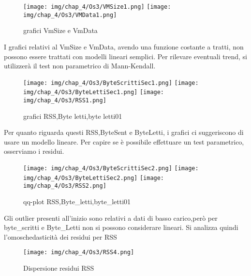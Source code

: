 \begin{figure}[H]
    \centering
    \texttt{[image: img/chap\_4/Os3/VMSize1.png]}
    \texttt{[image: img/chap\_4/Os3/VMData1.png]}
    \caption{grafici VmSize e VmData}
    \label{fig:sis_2_25_k}
\end{figure}
\noindent
I grafici relativi al VmSize e VmData, avendo una funzione costante a tratti, non possono essere trattati con modelli lineari semplici.
Per rilevare eventuali trend, si utilizzerà il test non parametrico di Mann-Kendall.
\begin{figure}[H]
    \centering
    \texttt{[image: img/chap\_4/Os3/ByteScrittiSec1.png]}
    \texttt{[image: img/chap\_4/Os3/ByteLettiSec1.png]}
    \texttt{[image: img/chap\_4/Os3/RSS1.png]}
    \caption{grafici RSS,Byte letti,byte letti01}
    \label{fig:sis_2_25_k}
\end{figure}
\noindent
Per quanto riguarda questi RSS,ByteSent e ByteLetti, i grafici ci suggeriscono di usare un modello lineare. Per capire se è possibile effettuare un test parametrico, osserviamo i residui.
\begin{figure}[H]
    \centering
    \texttt{[image: img/chap\_4/Os3/ByteScrittiSec2.png]}
    \texttt{[image: img/chap\_4/Os3/ByteLettiSec2.png]}
    \texttt{[image: img/chap\_4/Os3/RSS2.png]}
    \caption{qq-plot RSS,Byte\_letti,byte\_letti01}
    \label{fig:residui}
\end{figure}
\noindent
Gli outlier presenti all'inizio sono relativi a dati di basso carico,però per byte_scritti e Byte_Letti 
non si possono considerare lineari.
Si analizza quindi l'omoschedasticità dei residui per RSS
\begin{figure}[H]
    \centering
    \texttt{[image: img/chap\_4/Os3/RSS4.png]}
    \caption{Dispersione residui RSS}
    \label{fig:residui_non_omoschedastici}
\end{figure}
\noindent

